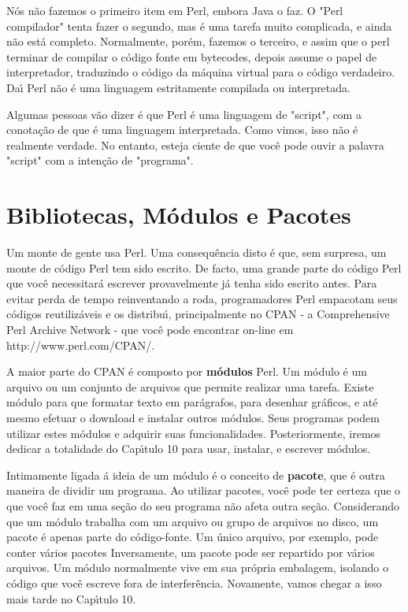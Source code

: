 \documentclass[a4paper,11pt]{book}
\begin{document}
\noindent N\'os n\~ao fazemos o primeiro item em Perl, embora Java o faz. O "Perl compilador" tenta fazer o segundo, mas \'e uma tarefa muito complicada, e ainda n\~ao est\'a completo. Normalmente, por\'em, fazemos o terceiro, e assim que o perl terminar de compilar o c\'odigo fonte em bytecodes, depois assume o papel de interpretador, traduzindo o c\'odigo da m\'aquina virtual para o c\'odigo verdadeiro. Da\'{\i} Perl n\~ao \'e uma linguagem  estritamente compilada ou interpretada.

\noindent 

\noindent Algumas pessoas v\~ao dizer \'e que Perl \'e uma linguagem de "script", com a conota\c{c}\~ao de que \'e uma linguagem interpretada. Como vimos, isso n\~ao \'e realmente verdade. No entanto, esteja ciente de que voc\^e pode ouvir a palavra "script" com a inten\c{c}\~ao de "programa".

\section{Bibliotecas, M\'odulos e Pacotes}

\noindent Um monte de gente usa Perl. Uma consequ\^encia disto \'e que, sem surpresa, um monte de c\'odigo Perl tem sido escrito. De facto, uma grande parte do c\'odigo Perl que voc\^e necessitar\'a escrever provavelmente j\'a tenha sido escrito antes. Para evitar perda de tempo reinventando a roda, programadores Perl empacotam seus c\'odigos reutiliz\'aveis e os distribu\'{\i}, principalmente no CPAN - a Comprehensive Perl Archive Network - que voc\^e pode encontrar on-line em http://www.perl.com/CPAN/.

\noindent 

\noindent A maior parte do CPAN \'e composto por \textbf{m\'odulos} Perl. Um m\'odulo \'e um arquivo ou um conjunto de arquivos que permite realizar uma tarefa. Existe m\'odulo para que formatar texto em par\'agrafos, para desenhar gr\'aficos, e at\'e mesmo efetuar o download e instalar outros m\'odulos. Seus programas podem utilizar estes m\'odulos e adquirir suas funcionalidades. Posteriormente, iremos dedicar a totalidade do Cap\'{\i}tulo 10 para usar, instalar, e escrever m\'odulos.

\noindent 

\noindent Intimamente ligada \'a ideia de um m\'odulo \'e o conceito de \textbf{pacote}, que \'e outra maneira de dividir um programa. Ao utilizar pacotes, voc\^e pode ter certeza que o que voc\^e faz em uma se\c{c}\~ao do seu programa n\~ao afeta outra se\c{c}\~ao. Considerando que um m\'odulo trabalha com um arquivo ou grupo de arquivos no disco, um pacote \'e apenas parte do c\'odigo-fonte. Um \'unico arquivo, por exemplo, pode conter v\'arios pacotes Inversamente, um pacote pode ser repartido por v\'arios arquivos. Um m\'odulo normalmente vive em sua pr\'opria embalagem, isolando o c\'odigo que voc\^e escreve fora de interfer\^encia. Novamente, vamos chegar a isso mais tarde no Cap\'{\i}tulo 10.
\end{document}
